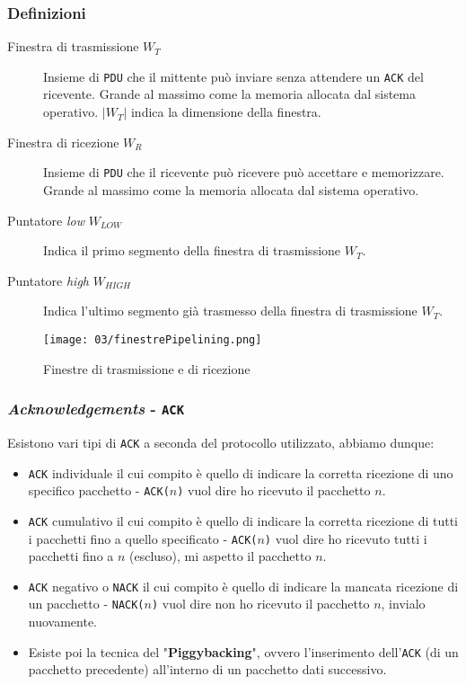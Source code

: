         \subsubsection{Definizioni}
            \begin{description}
                \item[Finestra di trasmissione $W_T$] Insieme di \texttt{PDU} che il mittente può inviare senza attendere un \texttt{ACK} del ricevente.
                    \subitem Grande al massimo come la memoria allocata dal sistema operativo.
                    \subitem $\left|W_T\right|$ indica la dimensione della finestra.
                \item[Finestra di ricezione $W_R$] Insieme di \texttt{PDU} che il ricevente può ricevere può accettare e memorizzare.
                    \subitem Grande al massimo come la memoria allocata dal sistema operativo.
                \item[Puntatore \textit{low} $W_{LOW}$] Indica il primo segmento della finestra di trasmissione $W_T$.
                \item[Puntatore \textit{high} $W_{HIGH}$] Indica l'ultimo segmento già trasmesso della finestra di trasmissione $W_T$.
            \end{description}
        
        \begin{figure}[H]
            \centering
            \texttt{[image: 03/finestrePipelining.png]}
            \caption{Finestre di trasmissione e di ricezione}
        \end{figure}
        \subsubsection{\textit{Acknowledgements} - \texttt{ACK}}
            Esistono vari tipi di \texttt{ACK} a seconda del protocollo utilizzato, abbiamo dunque:
            \begin{itemize}
                \item \texttt{ACK} individuale il cui compito è quello di indicare la corretta ricezione di uno specifico pacchetto - \texttt{ACK($n$)} vuol dire ho ricevuto il pacchetto $n$.
                \item \texttt{ACK} cumulativo il cui compito è quello di indicare la corretta ricezione di tutti i pacchetti fino a quello specificato - \texttt{ACK($n$)} vuol dire ho ricevuto tutti i pacchetti fino a $n$ (escluso), mi aspetto il pacchetto $n$.
                \item \texttt{ACK} negativo o \texttt{NACK} il cui compito è quello di indicare la mancata ricezione di un pacchetto - \texttt{NACK($n$)} vuol dire non ho ricevuto il pacchetto $n$, invialo nuovamente.
                \item Esiste poi la tecnica del "\textbf{Piggybacking}", ovvero l'inserimento dell'\texttt{ACK} (di un pacchetto precedente) all'interno di un pacchetto dati successivo.
            \end{itemize}
